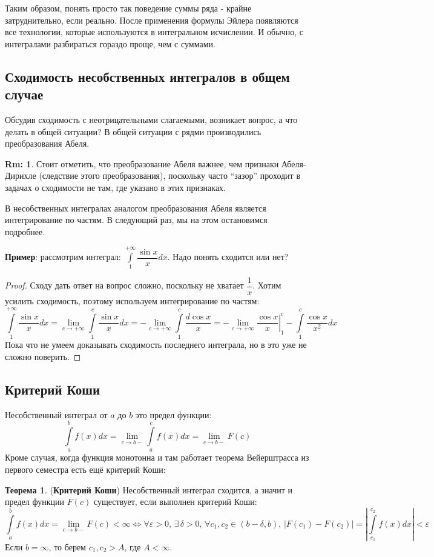 \documentclass[12pt]{article}
\newcommand{\VE}{\varepsilon}
\theoremstyle{definition}
\newtheorem{rem}{Rm:}
\newtheorem{theorem}{Теорема}
\newcommand{\ddint}[2]{\displaystyle\int\limits_{#1}^{#2}}
\begin{document}
Таким образом, понять просто так поведение суммы ряда - крайне затруднительно, если реально. После применения формулы Эйлера появляются все технологии, которые используются в интегральном исчислении. И обычно, с интегралами разбираться гораздо проще, чем с суммами.

\subsection*{Сходимость несобственных интегралов в общем случае}
Обсудив сходимость с неотрицательными слагаемыми, возникает вопрос, а что делать в общей ситуации? В общей ситуации с рядми производились преобразования Абеля. 
\begin{rem}
	Стоит отметить, что преобразование Абеля важнее, чем признаки Абеля-Дирихле (следствие этого преобразования), поскольку часто ``зазор'' проходит в задачах о сходимости не там, где указано в этих признаках.
\end{rem}
В несобственных интегралах аналогом преобразования Абеля является интегрирование по частям. В следующий раз, мы на этом остановимся подробнее.

\textbf{Пример}: рассмотрим интеграл: $\ddint{1}{+\infty}\dfrac{\sin{x}}{x}dx$. Надо понять сходится или нет? 
\begin{proof}
	Сходу дать ответ на вопрос сложно, поскольку не хватает $\dfrac{1}{x}$. Хотим усилить сходимость, поэтому используем интегрирование по частям:
	$$
		\ddint{1}{+\infty}\dfrac{\sin{x}}{x}dx = \lim\limits_{c \to +\infty} \ddint{1}{c}\dfrac{\sin{x}}{x}dx = -\lim\limits_{c \to +\infty} \ddint{1}{c}\dfrac{d \cos{x}}{x} = - \lim\limits_{c \to +\infty} \left.\dfrac{\cos{x}}{x}\right|_{1}^{c} - \ddint{1}{c}\dfrac{\cos{x}}{x^2}dx
	$$
	Пока что не умеем доказывать сходимость последнего интеграла, но в это уже не сложно поверить.
\end{proof}


\subsection*{Критерий Коши}
Несобственный интеграл от $a$ до $b$ это предел функции:
$$
	\ddint{a}{b}f(x)dx =\lim\limits_{c \to b-}\ddint{a}{c}f(x)dx = \lim\limits_{c \to b-}F(c)
$$
Кроме случая, когда функция монотонна и там работает теорема Вейерштрасса из первого семестра есть ещё критерий Коши:

\begin{theorem}(\textbf{Критерий Коши})
	Несобственный интеграл сходится, а значит и предел функции $F(c)$ существует, если выполнен критерий Коши:
	$$
		\ddint{a}{b}f(x)dx = \lim\limits_{c \to b-}F(c) < \infty \Leftrightarrow \forall \VE > 0, \, \exists \, \delta > 0, \, \forall c_1, c_2 \in (b -\delta,b), \, \left|F(c_1) - F(c_2)\right| = \left|\ddint{c_1}{c_2}f(x)dx \right| < \VE
	$$
	Если $b = \infty$, то берем $c_1, c_2 > A$, где $A < \infty$.
\end{theorem}
\end{document}
